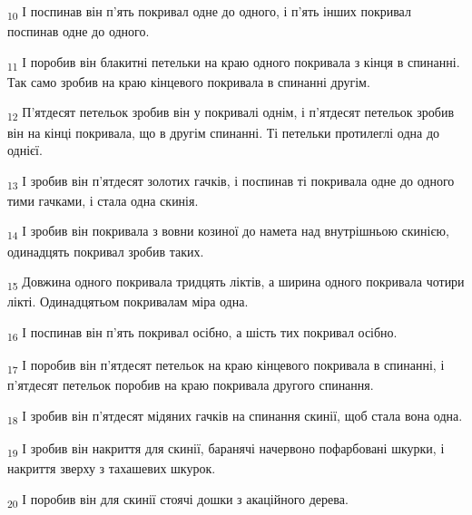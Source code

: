 \begin{tcolorbox}
\textsubscript{10} І поспинав він п'ять покривал одне до одного, і п'ять інших покривал поспинав одне до одного.
\end{tcolorbox}
\begin{tcolorbox}
\textsubscript{11} І поробив він блакитні петельки на краю одного покривала з кінця в спинанні. Так само зробив на краю кінцевого покривала в спинанні другім.
\end{tcolorbox}
\begin{tcolorbox}
\textsubscript{12} П'ятдесят петельок зробив він у покривалі однім, і п'ятдесят петельок зробив він на кінці покривала, що в другім спинанні. Ті петельки протилеглі одна до однієї.
\end{tcolorbox}
\begin{tcolorbox}
\textsubscript{13} І зробив він п'ятдесят золотих гачків, і поспинав ті покривала одне до одного тими гачками, і стала одна скинія.
\end{tcolorbox}
\begin{tcolorbox}
\textsubscript{14} І зробив він покривала з вовни козиної до намета над внутрішньою скинією, одинадцять покривал зробив таких.
\end{tcolorbox}
\begin{tcolorbox}
\textsubscript{15} Довжина одного покривала тридцять ліктів, а ширина одного покривала чотири лікті. Одинадцятьом покривалам міра одна.
\end{tcolorbox}
\begin{tcolorbox}
\textsubscript{16} І поспинав він п'ять покривал осібно, а шість тих покривал осібно.
\end{tcolorbox}
\begin{tcolorbox}
\textsubscript{17} І поробив він п'ятдесят петельок на краю кінцевого покривала в спинанні, і п'ятдесят петельок поробив на краю покривала другого спинання.
\end{tcolorbox}
\begin{tcolorbox}
\textsubscript{18} І зробив він п'ятдесят мідяних гачків на спинання скинії, щоб стала вона одна.
\end{tcolorbox}
\begin{tcolorbox}
\textsubscript{19} І зробив він накриття для скинії, баранячі начервоно пофарбовані шкурки, і накриття зверху з тахашевих шкурок.
\end{tcolorbox}
\begin{tcolorbox}
\textsubscript{20} І поробив він для скинії стоячі дошки з акаційного дерева.
\end{tcolorbox}
